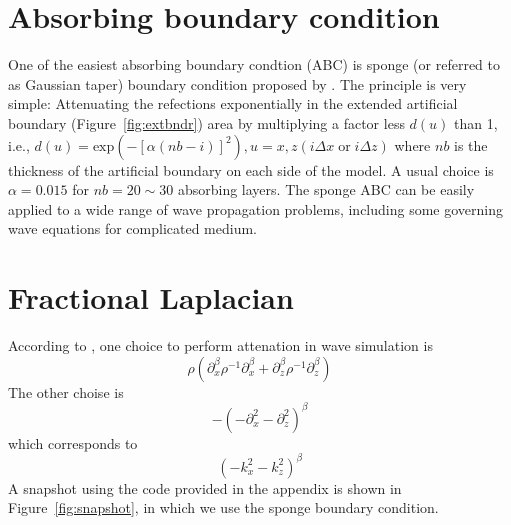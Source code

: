 \section{Absorbing boundary condition}

One of the easiest absorbing boundary condtion (ABC) is sponge (or referred to as Gaussian taper) boundary condition proposed by \cite{Cerjan_1985_NBC}. The principle is very simple: Attenuating the refections exponentially in the extended artificial boundary (Figure~\ref{fig:extbndr}) area by multiplying a factor less $d(u)$ than 1, i.e., $ d(u)=\mathrm{exp}(-[\alpha(nb-i)]^2), u=x,z (i\Delta x \; \mathrm{or} \; i\Delta z)$
where $nb$ is the thickness of the artificial boundary on each side of the model. A  usual choice is $\alpha=0.015$ for $nb=20\sim30$ absorbing layers. The sponge ABC can be easily applied to a wide range of wave propagation problems, including some  governing wave equations for complicated medium. 



\section{Fractional Laplacian}

According to \cite{Carcione_2010_GFP}, one choice to perform attenation in wave simulation is
\begin{equation}
 \rho (\partial_x^\beta \rho^{-1}\partial_x^\beta +\partial_z^\beta\rho^{-1}\partial_z^\beta )
\end{equation}
The other choise is
\begin{equation}
 -(-\partial_x^2-\partial_z^2)^\beta
\end{equation}
which corresponds to
\begin{equation}
  (-k_x^2-k_z^2)^\beta
\end{equation}
A snapshot using the code provided in the appendix is shown in Figure~\ref{fig:snapshot}, in which we use the sponge boundary condition.

